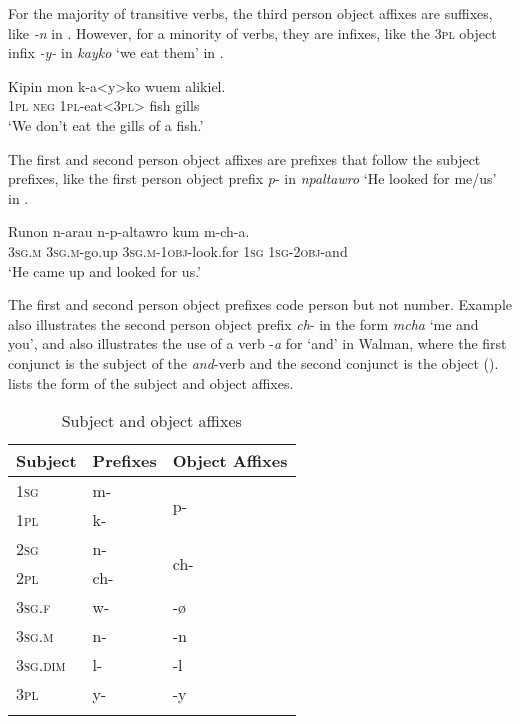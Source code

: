 \documentclass[output=paper]{langscibook}
\begin{document}
For the majority of transitive verbs, the third person object affixes are suffixes, like \emph{{}-n} in . However, for a minority of verbs, they are infixes, like the \textsc{3pl} object infix \emph{{}-y-} in \emph{kayko} ‘we eat them’ in .

\ea%
    \label{ex:Brown:2}
    \gll Kipin  mon  k-a<y>ko  wuem  alikiel.\\
   \textsc{1pl}  \textsc{neg} \textsc{1pl}{}-eat<\textsc{3pl}>  fish  gills\\
    \glt‘We don’t eat the gills of a fish.’\\
    \z


The first and second person object affixes are prefixes that follow the subject prefixes, like the first person object prefix \emph{p}{}- in \emph{npaltawro} ‘He looked for me/us’ in .

\ea%
    \label{ex:Brown:3}
    \gll Runon  n-arau  n-p-altawro  kum  m-ch-a.\\
        \textsc{3sg.m}  \textsc{3sg.m}{}-go.up  \textsc{3sg.m}{}-\textsc{1obj}{}-look.for  \textsc{1sg}  \textsc{1sg}{}-\textsc{2obj}{}-and\\
    \glt ‘He came up and looked for us.’
    \z

The first and second person object prefixes code person but not number. Example  also illustrates the second person object prefix \emph{ch}{}- in the form \emph{mcha} ‘me and you’, and also illustrates the use of a verb -\emph{a} for ‘and’ in Walman, where the first conjunct is the subject of the \emph{and}{}-verb and the second conjunct is the object (\citealt{BrownDryer2008}).  lists the form of the subject and object affixes.

\begin{table}
    \centering
  \begin{tabularx}{0.5\textwidth}{lll}
  \lsptoprule
Subject & Prefixes  & Object Affixes\\
\hline
{\textsc{1sg}}  & m- &  \multirow{2}{*}{p-}\\
{\textsc{1pl}}  & k- &  \\
{\textsc{2sg}}  & n- & \multirow{2}{*}{ch-}\\
{\textsc{2pl}}  & ch- &  \\
{\textsc{3sg.f}} & w- & {}-ø\\
{\textsc{3sg.m}} & n- & {}-n\\
{\textsc{3sg.dim}}  & l- & {}-l\\
{\textsc{3pl}} &  y- & {}-y\\
\lspbottomrule
\end{tabularx}
\caption{Subject and object affixes}\label{tab:Brown:1}

\end{table}
\end{document}

